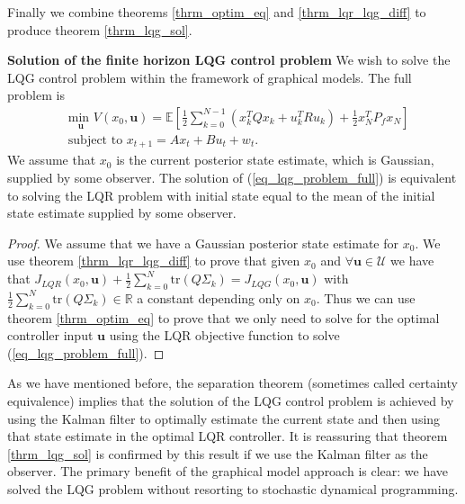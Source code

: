 Finally we combine theorems \ref{thrm_optim_eq} and \ref{thrm_lqr_lqg_diff} to produce theorem \ref{thrm_lqg_sol}.
\begin{thrm}
\textbf{Solution of the finite horizon LQG control problem} We wish to solve the LQG control problem within the framework of graphical models. The full problem is 
\begin{equation}
\begin{aligned}
&\underset{\mathbf{u}}{\text{min }} V(x_0, \mathbf{u}) = \mathbb{E}\left[ \frac{1}{2}\sum_{k=0}^{N-1} \left( x_k^TQx_k + u_k^TRu_k \right) + \frac{1}{2}x_N^TP_fx_N \right] \\
& \text{subject to } x_{t+1}=Ax_t+Bu_t + w_t.
\end{aligned}
\label{eq_lqg_problem_full}
\end{equation}
We assume that $x_0$ is the current posterior state estimate, which is Gaussian, supplied by some observer. The solution of (\ref{eq_lqg_problem_full}) is equivalent to solving the LQR problem with initial state equal to the mean of the initial state estimate supplied by some observer.
\label{thrm_lqg_sol}
\end{thrm}
\begin{proof}
We assume that we have a Gaussian posterior state estimate for $x_0$. We use theorem \ref{thrm_lqr_lqg_diff} to prove that given $x_0$ and $\forall \mathbf{u} \in \mathcal{U}$ we have that $J_{LQR}(x_0, \mathbf{u}) + \frac{1}{2}\sum_{k=0}^N \text{tr}(Q\Sigma_k) = J_{LQG}(x_0, \mathbf{u})$ with $\frac{1}{2}\sum_{k=0}^N \text{tr}(Q\Sigma_k) \in \mathbb{R}$ a constant depending only on $x_0$. Thus we can use theorem \ref{thrm_optim_eq} to prove that we only need to solve for the optimal controller input $\mathbf{u}$ using the LQR objective function to solve (\ref{eq_lqg_problem_full}). 
\end{proof}
As we have mentioned before, the separation theorem (sometimes called certainty equivalence) implies that the solution of the LQG control problem is achieved by using the Kalman filter to optimally estimate the current state and then using that state estimate in the optimal LQR controller. It is reassuring that theorem \ref{thrm_lqg_sol} is confirmed by this result if we use the Kalman filter as the observer. The primary benefit of the graphical model approach is clear: we have solved the LQG problem without resorting to stochastic dynamical programming.

